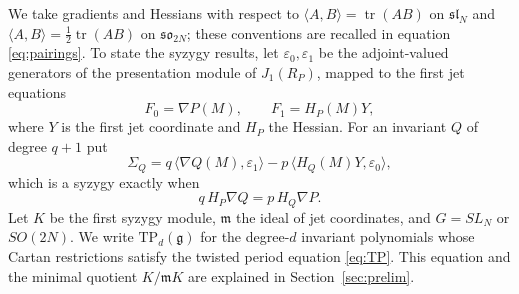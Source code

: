 \documentclass[10pt,reqno]{amsart}
\numberwithin{equation}{section}
\theoremstyle{plain}
\theoremstyle{definition}
\DeclareMathOperator{\tr}{tr}
\newcommand{\TP}{\mathrm{TP}}
\newcommand{\ip}[2]{\langle #1, #2\rangle}
\begin{document}
We take gradients and Hessians with respect to $\ip AB=\tr(AB)$ on $\mathfrak{sl}_N$ and $\ip AB=\tfrac12\tr(AB)$ on $\mathfrak{so}_{2N}$; these conventions are recalled in equation \eqref{eq:pairings}. To state the syzygy results, let $\varepsilon_0,\varepsilon_1$ be the adjoint-valued generators of the presentation module of $J_1(R_P)$, mapped to the first jet equations 
\begin{equation*}
    F_0=\nabla P(M),\qquad F_1=H_P(M)Y,
\end{equation*}
where $Y$ is the first jet coordinate and $H_P$ the Hessian. For an invariant $Q$ of degree $q+1$ put
\begin{equation}\label{eq:introSigmaQ}
	\Sigma_Q=q\,\ip{\nabla Q(M)}{\varepsilon_1}-p\,\ip{H_Q(M)Y}{\varepsilon_0},
\end{equation}
which is a syzygy exactly when
\begin{equation*}
    q\,H_P\nabla Q=p\,H_Q\nabla P .
\end{equation*}
Let $K$ be the first syzygy module, $\mathfrak{m}$ the ideal of jet coordinates, and $G=SL_N$ or $SO(2N)$. We write $\TP_d(\mathfrak g)$ for the degree-$d$ invariant polynomials whose Cartan restrictions satisfy the twisted period equation \eqref{eq:TP}. This equation and the minimal quotient $K/\mathfrak mK$ are explained in Section~\ref{sec:prelim}.
\newpage
\end{document}
